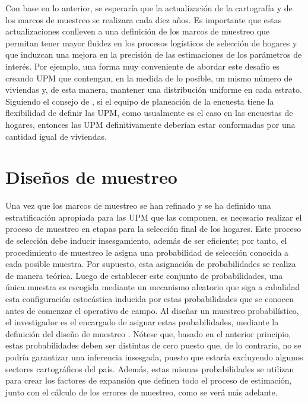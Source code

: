 Con base en lo anterior, se esperaría que la actualización de la cartografía y de los marcos de muestreo se realizara cada diez años. Es importante que estas actualizaciones conlleven a una definición de los marcos de muestreo que permitan tener mayor fluidez en los procesos logísticos de selección de hogares y que induzcan una mejora en la precisión de las estimaciones de los parámetros de interés. Por ejemplo, una forma muy conveniente de abordar este desafío es creando UPM que contengan, en la medida de lo posible, un mismo número de viviendas y, de esta manera, mantener una distribución uniforme en cada estrato. Siguiendo el consejo de \citet[pág. 212]{Valliant_Dever_Kreuter_2013}, si el equipo de planeación de la encuesta tiene la flexibilidad de definir las UPM, como usualmente es el caso en las encuestas de hogares, entonces las UPM definitivamente deberían estar conformadas por una cantidad igual de viviendas.

\hypertarget{disenos-de-muestreo}{%
\section{Diseños de muestreo}\label{disenos-de-muestreo}}

Una vez que los marcos de muestreo se han refinado y se ha definido una estratificación apropiada para las UPM que las componen, es necesario realizar el proceso de muestreo en etapas para la selección final de los hogares. Este proceso de selección debe inducir insesgamiento, además de ser eficiente; por tanto, el procedimiento de muestreo le asigna una probabilidad de selección conocida a cada posible muestra. Por supuesto, esta asignación de probabilidades se realiza de manera teórica. Luego de establecer este conjunto de probabilidades, una única muestra es escogida mediante un mecanismo aleatorio que siga a cabalidad esta configuración estocástica inducida por estas probabilidades que se conocen antes de comenzar el operativo de campo. Al diseñar un muestreo probabilístico, el investigador es el encargado de asignar estas probabilidades, mediante la definición del diseño de muestreo \citep{Sarndal_Swensson_Wretman_2003}. Nótese que, basado en el anterior principio, estas probabilidades deben ser distintas de cero puesto que, de lo contrario, no se podría garantizar una inferencia insesgada, puesto que estaría excluyendo algunos sectores cartográficos del país. Además, estas mismas probabilidades se utilizan para crear los factores de expansión que definen todo el proceso de estimación, junto con el cálculo de los errores de muestreo, como se verá más adelante.

